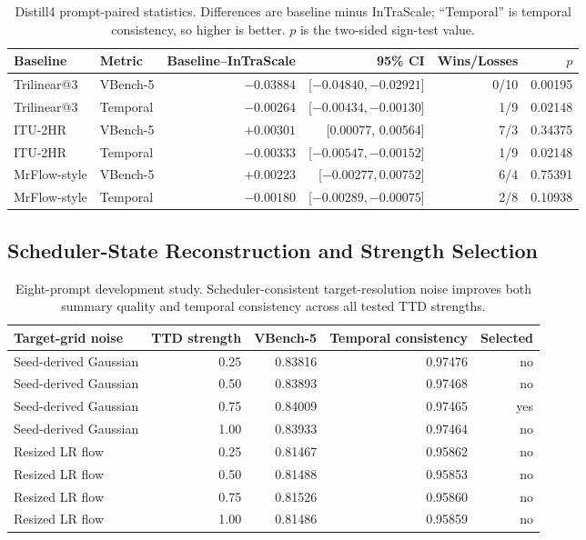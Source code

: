\documentclass[letterpaper]{article}
\begin{document}
\begin{table}[t]
  \centering
  \small
  \setlength{\tabcolsep}{4pt}
  \begin{tabular}{llrrrr}
    \toprule
    Baseline & Metric & Baseline--InTraScale & 95\% CI & Wins/Losses & \(p\) \\
    \midrule
    Trilinear@3 & VBench-5 & \(-0.03884\) & [\(-0.04840,-0.02921\)] &
    0/10 & 0.00195 \\
    Trilinear@3 & Temporal & \(-0.00264\) & [\(-0.00434,-0.00130\)] &
    1/9 & 0.02148 \\
    ITU-2HR & VBench-5 & \(+0.00301\) & [0.00077, 0.00564] &
    7/3 & 0.34375 \\
    ITU-2HR & Temporal & \(-0.00333\) & [\(-0.00547,-0.00152\)] &
    1/9 & 0.02148 \\
    MrFlow-style & VBench-5 & \(+0.00223\) & [\(-0.00277,0.00752\)] &
    6/4 & 0.75391 \\
    MrFlow-style & Temporal & \(-0.00180\) & [\(-0.00289,-0.00075\)] &
    2/8 & 0.10938 \\
    \bottomrule
  \end{tabular}
  \caption{Distill4 prompt-paired statistics.  Differences are baseline minus
  InTraScale; ``Temporal'' is temporal consistency, so higher is better.
  \(p\) is the two-sided sign-test value.}
  \label{tab:distill4-stats}
\end{table}

\subsection{Scheduler-State Reconstruction and Strength Selection}

\begin{table}[t]
  \centering
  \small
  \setlength{\tabcolsep}{4pt}
  \begin{tabular}{lrrrr}
    \toprule
    Target-grid noise & TTD strength & VBench-5 & Temporal consistency & Selected \\
    \midrule
    Seed-derived Gaussian & 0.25 & 0.83816 & 0.97476 & no \\
    Seed-derived Gaussian & 0.50 & 0.83893 & 0.97468 & no \\
    Seed-derived Gaussian & 0.75 & 0.84009 & 0.97465 & yes \\
    Seed-derived Gaussian & 1.00 & 0.83933 & 0.97464 & no \\
    Resized LR flow & 0.25 & 0.81467 & 0.95862 & no \\
    Resized LR flow & 0.50 & 0.81488 & 0.95853 & no \\
    Resized LR flow & 0.75 & 0.81526 & 0.95860 & no \\
    Resized LR flow & 1.00 & 0.81486 & 0.95859 & no \\
    \bottomrule
  \end{tabular}
  \caption{Eight-prompt development study.  Scheduler-consistent
  target-resolution noise improves both summary quality and temporal
  consistency across all tested TTD strengths.}
  \label{tab:state-reconstruction}
\end{table}
\FloatBarrier
\end{document}
